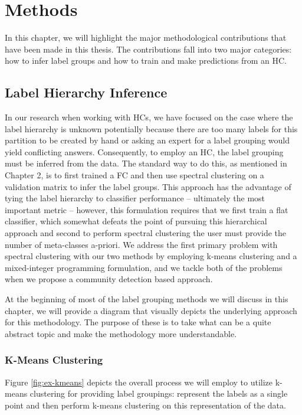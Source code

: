 \documentclass[../thesis.tex]{subfiles}
\begin{document}
\chapter{Methods}
In this chapter, we will highlight the major methodological contributions that have been made in this thesis. The contributions fall into two major categories: how to infer label groups and how to train and make predictions from an HC. 

\section{Label Hierarchy Inference}
In our research when working with HCs, we have focused on the case where the label hierarchy is unknown potentially because there are too many labels for this partition to be created by hand or asking an expert for a label grouping would yield conflicting answers. Consequently, to employ an HC, the label grouping must be inferred from the data. The standard way to do this, as mentioned in Chapter 2, is to first trained a FC and then use spectral clustering on a validation matrix to infer the label groups. This approach has the advantage of tying the label hierarchy to classifier performance -- ultimately the most important metric -- however, this formulation requires that we first train a flat classifier, which somewhat defeats the point of pursuing this hierarchical approach and second to perform spectral clustering the user must provide the number of meta-classes a-priori. We address the first primary problem with spectral clustering with our two methods by employing k-means clustering and a mixed-integer programming formulation, and we tackle both of the problems when we propose a community detection based approach.

At the beginning of most of the label grouping methods we will discuss in this chapter, we will provide a diagram that visually depicts the underlying approach for this methodology. The purpose of these is to take what can be a quite abstract topic and make the methodology more understandable.

\subsection{K-Means Clustering}
Figure \ref{fig:ex-kmeans} depicts the overall process we will employ to utilize k-means clustering for providing label groupings: represent the labels as a single point and then perform k-means clustering on this representation of the data.
\end{document}
